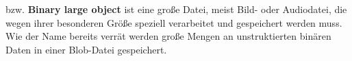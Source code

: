 bzw. \textbf{Binary large object} ist eine große Datei, meist Bild- oder Audiodatei, die wegen
ihrer besonderen Größe speziell verarbeitet und gespeichert werden muss. Wie der Name bereits verrät 
werden große Mengen an unstruktierten binären Daten in einer Blob-Datei gespeichert.